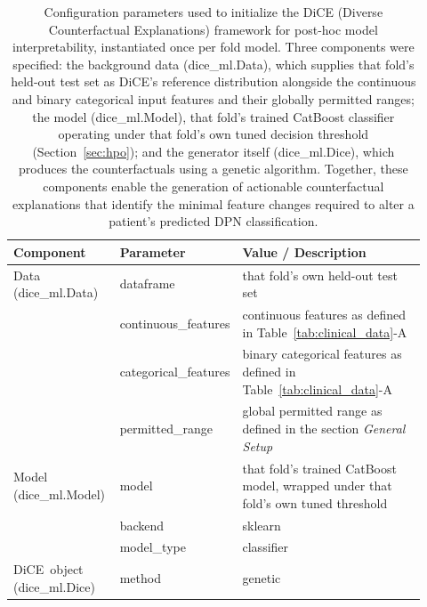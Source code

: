 \documentclass[pdflatex,sn-mathphys-num]{sn-jnl}%
\theoremstyle{thmstyleone}%
\theoremstyle{thmstyletwo}%
\theoremstyle{thmstylethree}%
\begin{document}
\begin{appendices}
\begin{table}[tbp]
    \centering
    \footnotesize
    \begin{tabular}{@{}p{0.26\linewidth} p{0.19\linewidth} p{0.47\linewidth}@{}}
        \toprule
        Component & Parameter & Value / Description \\
        \midrule
        Data (dice\_ml.Data) & dataframe & that fold's own held-out test set \\
        & continuous\_features & continuous features as defined in \mbox{Table~\ref{tab:clinical_data}-A} \\
        & categorical\_features & binary categorical features as defined in \mbox{Table~\ref{tab:clinical_data}-A} \\
        & permitted\_range & global permitted range as defined in the section \textit{General Setup}\\
        \midrule
        Model (dice\_ml.Model) & model & that fold's trained CatBoost model, wrapped under that fold's own tuned threshold \\
        & backend & sklearn \\
        & model\_type & classifier \\
        \midrule
        DiCE~object (dice\_ml.Dice)  & method & genetic \\
        \bottomrule
    \end{tabular}
    \caption{Configuration parameters used to initialize the DiCE (Diverse Counterfactual Explanations) framework for post-hoc model interpretability, instantiated once per fold model. Three components were specified: the background data (dice\_ml.Data), which supplies that fold's held-out test set as DiCE's reference distribution alongside the continuous and binary categorical input features and their globally permitted ranges; the model (dice\_ml.Model), that fold's trained CatBoost classifier operating under that fold's own tuned decision threshold (Section~\ref{sec:hpo}); and the generator itself (dice\_ml.Dice), which produces the counterfactuals using a genetic algorithm. Together, these components enable the generation of actionable counterfactual explanations that identify the minimal feature changes required to alter a patient's predicted DPN classification.}
    \label{tab:dice_setup}
\end{table}


\end{appendices}
\end{document}
